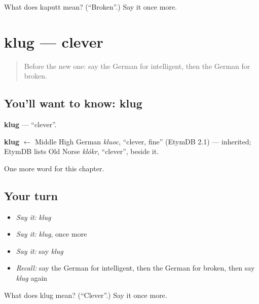 \begin{tcolorbox}[breakable,colback=teal!4,colframe=teal!35!black,title={Before you move on}]
What does kaputt mean? (\textquotedblleft{}Broken\textquotedblright{}.) Say it once more.
\end{tcolorbox}
\section[klug]{klug — clever}

\label{lesson:GE-C217-klug}



\begin{quote}
Before the new one: say the German for intelligent, then the German for broken.
\end{quote}

\subsection*{You'll want to know: klug}
\textbf{klug} — \textquotedblleft{}clever\textquotedblright{}.

\begin{cousinweb}
\textbf{klug} $\leftarrow$ Middle High German \emph{kluoc}, \textquotedblleft{}clever, fine\textquotedblright{} (EtymDB 2.1) — inherited; EtymDB lists Old Norse \emph{klókr}, \textquotedblleft{}clever\textquotedblright{}, beside it.
\end{cousinweb}

\begin{grammarlens}[title={What you've built}]
One more word for this chapter.
\end{grammarlens}

\subsection*{Your turn}
\begin{itemize}
\raggedright
  \item \emph{Say it:} \emph{klug}
  \item \emph{Say it:} \emph{klug}, once more
  \item \emph{Say it:} say \emph{klug}
  \item \emph{Recall:} say the German for intelligent, then the German for broken, then say \emph{klug} again
\end{itemize}

\begin{tcolorbox}[breakable,colback=teal!4,colframe=teal!35!black,title={Before you move on}]
What does klug mean? (\textquotedblleft{}Clever\textquotedblright{}.) Say it once more.
\end{tcolorbox}
